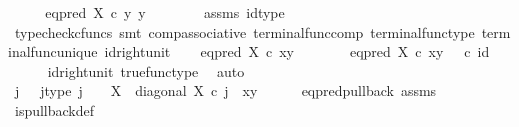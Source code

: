 \begin{isabellebody}
\ \ \isamarkupfalse%
\ \isamarkupfalse%
\ {\isachardoublequoteopen}eq{\isacharunderscore}{\kern0pt}pred\ X\ {\isasymcirc}\isactrlsub c\ {\isasymlangle}y{\isacharcomma}{\kern0pt}\ y{\isasymrangle}\ {\isacharequal}{\kern0pt}\ {\isasymt}{\isachardoublequoteclose}\isanewline
\ \ \ \ \isamarkupfalse%
\ assms\ id{\isacharunderscore}{\kern0pt}type\isanewline
\ \ \ \ \isamarkupfalse%
\ {\isacharparenleft}{\kern0pt}typecheck{\isacharunderscore}{\kern0pt}cfuncs{\isacharcomma}{\kern0pt}\ smt\ comp{\isacharunderscore}{\kern0pt}associative{}\ terminal{\isacharunderscore}{\kern0pt}func{\isacharunderscore}{\kern0pt}comp\ terminal{\isacharunderscore}{\kern0pt}func{\isacharunderscore}{\kern0pt}type\ terminal{\isacharunderscore}{\kern0pt}func{\isacharunderscore}{\kern0pt}unique\ id{\isacharunderscore}{\kern0pt}right{\isacharunderscore}{\kern0pt}unit{}{\isacharparenright}{\kern0pt}\isanewline
{}\isamarkupfalse%
\isanewline
\ \ \isamarkupfalse%
\ {\isachardoublequoteopen}eq{\isacharunderscore}{\kern0pt}pred\ X\ {\isasymcirc}\isactrlsub c\ {\isasymlangle}x{\isacharcomma}{\kern0pt}y{\isasymrangle}\ {\isacharequal}{\kern0pt}\ {\isasymt}{\isachardoublequoteclose}\isanewline
\ \ \isamarkupfalse%
\ \isamarkupfalse%
\ {\isachardoublequoteopen}eq{\isacharunderscore}{\kern0pt}pred\ X\ {\isasymcirc}\isactrlsub c\ {\isasymlangle}x{\isacharcomma}{\kern0pt}y{\isasymrangle}\ {\isacharequal}{\kern0pt}\ {\isasymt}\ {\isasymcirc}\isactrlsub c\ id\ {\isasymone}{\isachardoublequoteclose}\isanewline
\ \ \ \ \isamarkupfalse%
\ id{\isacharunderscore}{\kern0pt}right{\isacharunderscore}{\kern0pt}unit{}\ true{\isacharunderscore}{\kern0pt}func{\isacharunderscore}{\kern0pt}type\ \isamarkupfalse%
\ auto\isanewline
\ \ \isamarkupfalse%
\ \isamarkupfalse%
\ j\ \ \ j{\isacharunderscore}{\kern0pt}type{\isacharcolon}{\kern0pt}\ {\isachardoublequoteopen}j\ {\isacharcolon}{\kern0pt}\ {\isasymone}\ {\isasymrightarrow}\ X{\isachardoublequoteclose}\ \ {\isachardoublequoteopen}diagonal\ X\ {\isasymcirc}\isactrlsub c\ j\ {\isacharequal}{\kern0pt}\ {\isasymlangle}x{\isacharcomma}{\kern0pt}y{\isasymrangle}{\isachardoublequoteclose}\isanewline
\ \ \ \ \isamarkupfalse%
\ eq{\isacharunderscore}{\kern0pt}pred{\isacharunderscore}{\kern0pt}pullback\ assms\ \isamarkupfalse%
\ is{\isacharunderscore}{\kern0pt}pullback{\isacharunderscore}{\kern0pt}def\ \isamarkupfalse%

\end{isabellebody}
